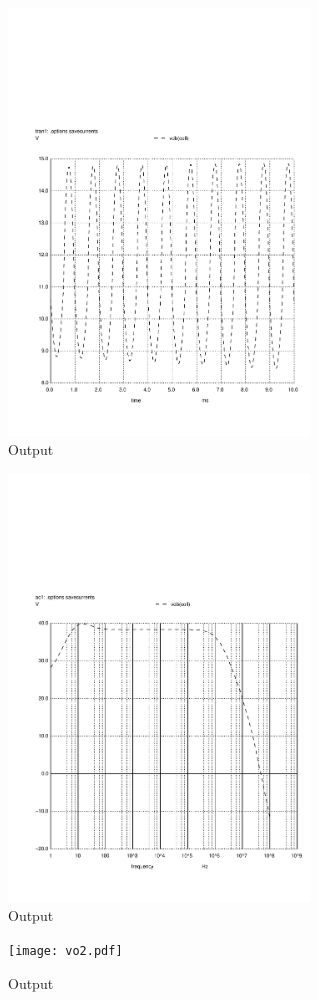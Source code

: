 \begin{figure}[H] 
\centering
\includegraphics[width = 8cm]{vo1.pdf} 
\caption{Output}
\label{vo1}
\end{figure}

\begin{figure}[H] 
\centering
\includegraphics[width = 8cm]{vo1f.pdf} 
\caption{Output}
\label{vo1f}
\end{figure}

\begin{figure}[H] 
\centering
\texttt{[image: vo2.pdf]} 
\caption{Output}
\label{vo2f}
\end{figure}
